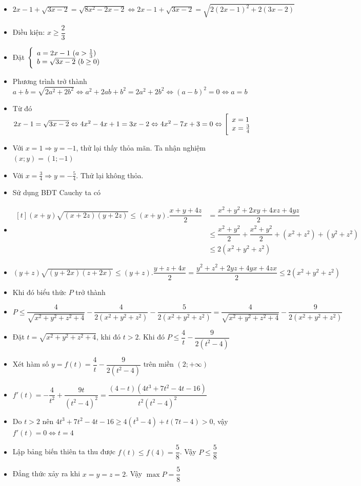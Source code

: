 \begin{itemize}[label=,leftmargin=*]
\item $2x-1+\sqrt{3x-2}=\sqrt{8x^2-2x-2}\Leftrightarrow 2x-1+\sqrt{3x-2}=\sqrt{2(2x-1)^2+2(3x-2)}$
\item Điều kiện: $x\ge \dfrac{2}{3}$
\item Đặt $\left\{\begin{array}{ll}a=2x-1 \ (a>\frac{1}{3})\\ b=\sqrt{3x-2} \ (b \ge 0)\end{array}\right.$
\item Phương trình trở thành $a+b=\sqrt{2a^2+2b^2}\Leftrightarrow a^2+2ab+b^2=2a^2+2b^2\Leftrightarrow (a-b)^2=0 \Leftrightarrow a=b$
\item Từ đó $2x-1=\sqrt{3x-2}\Leftrightarrow 4x^2-4x+1=3x-2\Leftrightarrow 4x^2-7x+3=0 \Leftrightarrow \left[\begin{array}{ll}x=1 \\ x=\frac{3}{4}\end{array}\right.$
\item Với $x=1 \Rightarrow y=-1$, thử lại thấy thỏa mãn. Ta nhận nghiệm $(x;y)=(1;-1)$
\item Với $x=\frac{3}{4}\Rightarrow y=-\frac{5}{4}$. Thử lại không thỏa.
\end{itemize}

\lgi 
\begin{itemize}[label=,leftmargin=*]
\item Sử dụng BĐT Cauchy ta có 
\item $\begin{aligned}[t](x+y)\sqrt{(x+2z)(y+2z)	}\le (x+y).\dfrac{x+y+4z}{2}&=\dfrac{x^2+y^2+2xy+4xz+4yz}{2}\\
& \le \dfrac{x^2+y^2}{2}+\dfrac{x^2+y^2}{2}+(x^2+z^2)+(y^2+z^2) \\
&\le 2(x^2+y^2+z^2) \end{aligned}$
\item $(y+z)\sqrt{(y+2x)(z+2x)}\le (y+z).\dfrac{y+z+4x}{2}=\dfrac{y^2+z^2+2yz+4yx+4zx}{2}\le 2(x^2+y^2+z^2)$
\item Khi đó biểu thức $P$ trở thành
\item $P\le \dfrac{4}{\sqrt{x^2+y^2+z^2+4}}-\dfrac{4}{2(x^2+y^2+z^2)}-\dfrac{5}{2(x^2+y^2+z^2)}=\dfrac{4}{\sqrt{x^2+y^2+z^2+4}}-\dfrac{9}{2(x^2+y^2+z^2)}$
\item Đặt $t=\sqrt{x^2+y^2+z^2+4}$, khi đó $t>2$. Khi đó $P \le \dfrac{4}{t}-\dfrac{9}{2(t^2-4)}$
\item Xét hàm số $y=f(t)=\dfrac{4}{t}-\dfrac{9}{2(t^2-4)}$ trên miền $(2;+\infty)$
\item $f'(t)=-\dfrac{4}{t^2}+\dfrac{9t}{(t^2-4)^2}=\dfrac{(4-t)(4t^3+7t^2-4t-16)}{t^2(t^2-4)^2}$
\item Do $t>2$ nên $4t^3+7t^2-4t-16\ge 4(t^3-4)+t(7t-4)>0$, vậy $f'(t)=0\Leftrightarrow t=4$
\item Lập bảng biến thiên ta thu được $f(t) \le f(4)=\dfrac{5}{8}$. Vậy $P\le \dfrac{5}{8}$
\item Đẳng thức xảy ra khi $x=y=z=2$. Vậy $\max P=\dfrac{5}{8}$
\end{itemize}

